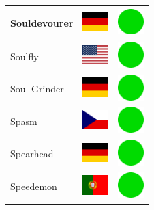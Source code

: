 \documentclass[12pt, a4paper, twoside]{report}
\begin{document}
\begin{center}
\begin{longtable}{|p{5cm}|p{2cm}|p{2cm}|}
 Souldevourer                                               & \includegraphics[width=1cm]{4x3/de} &   \includegraphics[width=1cm]{likes/y} \\ \hline
 Soulfly                                                    & \includegraphics[width=1cm]{4x3/us} &   \includegraphics[width=1cm]{likes/y} \\ \hline
 Soul Grinder                                               & \includegraphics[width=1cm]{4x3/de} &   \includegraphics[width=1cm]{likes/y} \\ \hline
 Spasm                                                      & \includegraphics[width=1cm]{4x3/cz} &   \includegraphics[width=1cm]{likes/y} \\ \hline
 Spearhead                                                  & \includegraphics[width=1cm]{4x3/de} &   \includegraphics[width=1cm]{likes/y} \\ \hline
 Speedemon                                                  & \includegraphics[width=1cm]{4x3/pt} &   \includegraphics[width=1cm]{likes/y} \\ \hline

\end{longtable}
\end{center}
\end{document}

